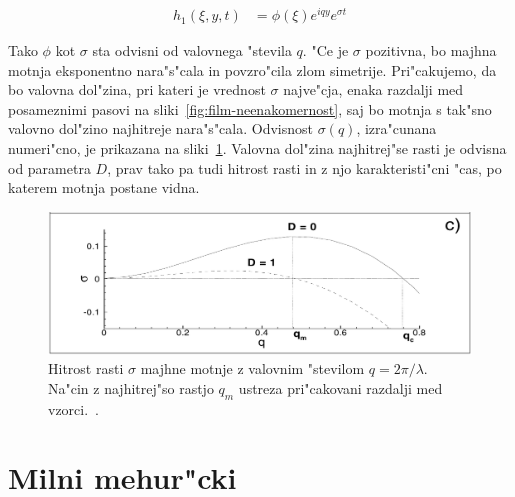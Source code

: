 \documentclass[a4paper,10pt]{article}
\begin{document}
\begin{align}
  h_1(\xi, y, t) &= \phi(\xi) e^{iqy} e^{\sigma t}
\end{align}

Tako $\phi$ kot $\sigma$ sta odvisni od valovnega "stevila $q$. "Ce je $\sigma$ pozitivna, bo majhna motnja eksponentno nara"s"cala in povzro"cila zlom simetrije. Pri"cakujemo, da bo valovna dol"zina, pri kateri je vrednost $\sigma$ najve"cja, enaka razdalji med posameznimi pasovi na sliki~\ref{fig:film-neenakomernost}, saj bo motnja s tak"sno valovno dol"zino najhitreje nara"s"cala. Odvisnost $\sigma(q)$, izra"cunana numeri"cno, je prikazana na sliki~\ref{fig:film-rast}. Valovna dol"zina najhitrej"se rasti je odvisna od parametra $D$, prav tako pa tudi hitrost rasti in z njo karakteristi"cni "cas, po katerem motnja postane vidna. 


\begin{figure}[h]
 \centering
 \includegraphics[width=.8\textwidth]{./Slike/film-stabilnost}
 \caption{Hitrost rasti $\sigma$ majhne motnje z valovnim "stevilom $q=2\pi/\lambda$. Na"cin z najhitrej"so rastjo $q_m$ ustreza pri"cakovani razdalji med vzorci.~\cite{kondic}. }
 \label{fig:film-rast}
\end{figure}

\newpage
\section{Milni mehur"cki}
\end{document}
